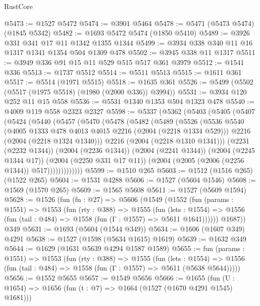 \begin{lexlean}{RustCore}
\begin{coremodule}
@5473 := @1527 @5472
@5474 := @3901 @5464
@5478 := @5471 (@5473 @5474) (@1845 @5342)
@5482 := @1693 @5472 @5474 (@1850 @5410)
@5489 := @3926 @331 @341 @17 @11 @1342 @1355 @1344
@5499 := @3934 @338 @340 @11 @16 @1317 @1341 @1354 @504 @1309 @478
@5502 := @3945 @338 @11 @1317
@5511 := @3949 @336 @91 @15 @11 @529 @515 @517 @361 @3979
@5512 := @1541 @336
@5513 := @1737 @5512
@5514 := @5511 @5513
@5515 := @1611 @361
@5517 := @5514 (@1971 @5515)
@5518 := @1635 @361
@5526 := @5499 (@5502 (@5517 (@1975 @5518) (@1980 (@2000 @336)) @3994))
@5531 := @3934 @120 @252 @11 @15 @558
@5536 := @5531 @1340 @1353 @504 @1323 @478
@5540 := @4009 @119 @558 @2323 @2327
@5598 := @5337
    (@5362
      (@5403
        (@5405
          (@5407
            (@5424
              (@5440
                (@5457
                  (@5470
                    (@5478
                      (@5482
                        (@5489
                          (@5526
                            (@5536
                              @5540
                              (@4005 @1333 @478 @4013 @4015 @2216 (@2004 (@2218 @1334 @529)))
                              @2216
                              (@2004 (@2218 @1324 @1340)))
                            @2216
                            (@2004 (@2218 @1310 @1341)))
                          (@2231 (@2232 @1344))
                          (@2004 (@2236 @1344))
                          (@2004 (@2241 @1344))
                          (@2004 (@2245 @1344 @17))
                          (@2004 (@2250 @331 @17 @11))
                          (@2004 (@2005 (@2006 (@2256 @1344)) @517)))))))))))))
@5599 := @1510 @265
@5603 := @1512 (@1516 @265) (@1522 @265)
@5604 := @1531 @4288
@5606 := @1527 (@5604 @1546)
@5608 := @1569 (@1570 @265)
@5609 := @1565 @5608
@5611 := @1527 (@5609 @1594)
@5628 := @1526
    (fun (fn : @27) =>
    @5606
      (@1549
        (@1552
          (fun (params : @1551) =>
          @1553
            (fun (rty : @388) =>
            @1555
              (fun (lets : @1554) =>
              @1556 (fun (tail : @484) => @1558 (fun (Γ : @1557) => @5611 @1641))))))
        @1687))
    @349
@5631 := @1693 (@5604 (@1544 @349))
@5634 := @1606 (@1607 @349) @4291
@5638 := @1527 (@1598 (@5634 @1615) @1619)
@5639 := @1632 @349
@5644 := @1629 (@1631 @5639 @4294 @1587 @1589)
@5655 := fun (params : @1551) =>
  @1553
    (fun (rty : @388) =>
    @1555
      (fun (lets : @1554) =>
      @1556 (fun (tail : @484) => @1558 (fun (Γ : @1557) => @5611 (@5638 @5644)))))
@5656 := @1552 @5655
@5657 := @1549 @5656
@5666 := @1655 (fun (U : @1654) => @1656 (fun (t : @7) => @1664 (@1527 (@1670 @4291 @1545) @1681)))

\end{coremodule}
\end{lexlean}
